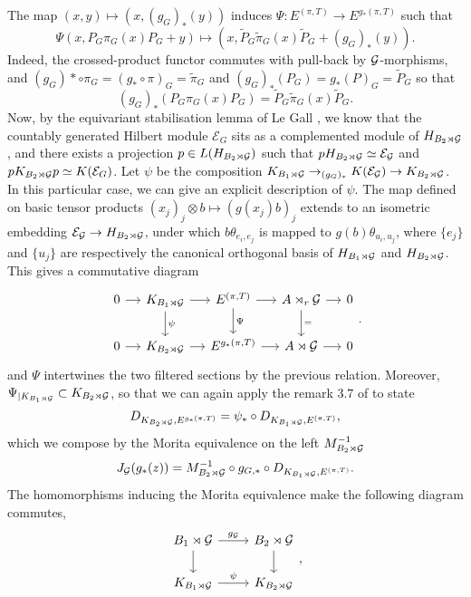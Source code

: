 \begin{dem}
\begin{enumerate}
The map $(x,y)\mapsto (x, (g_G)_*(y))$ induces $\Psi :E^{(\pi,T)}\rightarrow  E^{g_*(\pi,T)} $ such that
\[\Psi(x,P_G \pi_G(x) P_G +y)\mapsto (x,\tilde P_G \tilde\pi_G(x) \tilde P_G+(g_G)_*(y)).\]
Indeed, the crossed-product functor commutes with pull-back by $\mathcal G$-morphisms, and $(g_G)*\circ\pi_G=(g_*\circ\pi)_G=\tilde \pi_G$ and $(g_G)_*(P_G) = g_*(P)_G=\tilde P_G$ so that 
\[(g_G)_*(P_G \pi_G(x) P_G)=\tilde P_G \tilde\pi_G(x) \tilde P_G. \]
Now, by the equivariant stabilisation lemma of Le Gall \cite{LeGall}, we know that the countably generated Hilbert module $\mathcal E_G$ sits as a complemented module of $H_{B_2\rtimes\mathcal G}$, and there exists a projection $p\in L(H_{B_2\rtimes\mathcal G})$ such that $pH_{B_2\rtimes\mathcal G}\simeq \mathcal E_\mathcal G$ and $pK_{B_2\rtimes\mathcal G}p\simeq K(\mathcal E_G)$. Let $\psi$ be the composition $K_{B_1\rtimes \mathcal G}\rightarrow_{(g_G)_*} K(\mathcal E_\mathcal G)\rightarrow K_{B_2\rtimes \mathcal G}$. In this particular case, we can give an explicit description of $\psi$. The map defined on basic tensor products $(x_j)_{j}\otimes b\mapsto (g(x_j)b)_j $ extends to an isometric embedding $\mathcal E_\mathcal G \rightarrow H_{B_2\rtimes \mathcal G}$, under which $ b\theta_{e_i,e_j}$ is mapped to $g(b)\theta_{u_i,u_j}$, where $\{e_j\}$ and $\{u_j\}$ are respectively the canonical orthogonal basis of $H_{B_1 \rtimes\mathcal G}$ and $H_{B_2 \rtimes\mathcal G}$. This gives a commutative diagram 
\[\begin{tikzcd}[column sep = small]
0\arrow{r} & K_{B_1\rtimes \G}\arrow{r}\arrow{d}{\psi} & E^{(\pi,T)} \arrow{r}\arrow{d}{\Psi}& A\rtimes_r \G\arrow{r}\arrow{d}{=} & 0\\
0\arrow{r} & K_{B_2\rtimes \G}\arrow{r} & E^{g_*(\pi,T)} \arrow{r}& A\rtimes \G\arrow{r} & 0
\end{tikzcd}.\]
and $\Psi$ intertwines the two filtered sections by the previous relation. Moreover, $\Psi_{|K_{B_1\rtimes \mathcal G}}\subset K_{B_2\rtimes\mathcal G}$, so that we can again apply the remark $3.7$ of \cite{OY2} to state
\[ D_{K_{B_2\rtimes \mathcal G},E^{g_*(\pi,T)}}=\psi_*\circ D_{K_{B_1\rtimes \mathcal G},E^{(\pi,T)}},\]
which we compose by the Morita equivalence on the left $M_{B_2\rtimes\mathcal G}^{-1}$
\[J_\mathcal G(g_*(z)) = M_{B_2\rtimes\mathcal G}^{-1}\circ g_{G,*}\circ D_{K_{B_1\rtimes \mathcal G},E^{(\pi,T)}}.\]
The homomorphisms inducing the Morita equivalence make the following diagram commutes,
\[\begin{tikzcd}B_1\rtimes\G\arrow{r}{g_\G}\arrow{d} & B_2\rtimes \G\arrow{d} \\ K_{B_1\rtimes\G } \arrow{r}{\psi}& K_{B_2\rtimes\G }\end{tikzcd},\]

\end{enumerate}
\end{dem}
